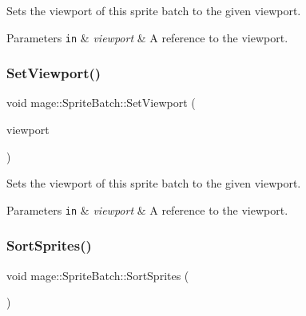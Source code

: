 Sets the viewport of this sprite batch to the given viewport.


\begin{DoxyParams}[1]{Parameters}
\mbox{\tt in}  & {\em viewport} & A reference to the viewport. \\
\hline
\end{DoxyParams}
\hypertarget{classmage_1_1_sprite_batch_aef86940ffc869785fb8ff8eb85ab7b46}{}\label{classmage_1_1_sprite_batch_aef86940ffc869785fb8ff8eb85ab7b46} 
\subsubsection{\texorpdfstring{Set\+Viewport()}{SetViewport()}\hspace{0.1cm}{\footnotesize\ttfamily [2/2]}}
{\footnotesize\ttfamily void mage\+::\+Sprite\+Batch\+::\+Set\+Viewport (\begin{DoxyParamCaption}\item[{D3\+D11\+\_\+\+V\+I\+E\+W\+P\+O\+RT \&\&}]{viewport }\end{DoxyParamCaption})\hspace{0.3cm}{\ttfamily [noexcept]}}

Sets the viewport of this sprite batch to the given viewport.


\begin{DoxyParams}[1]{Parameters}
\mbox{\tt in}  & {\em viewport} & A reference to the viewport. \\
\hline
\end{DoxyParams}
\hypertarget{classmage_1_1_sprite_batch_af7a5d406b02cd477c9b80eae9984aa86}{}\label{classmage_1_1_sprite_batch_af7a5d406b02cd477c9b80eae9984aa86} 
\subsubsection{\texorpdfstring{Sort\+Sprites()}{SortSprites()}}
{\footnotesize\ttfamily void mage\+::\+Sprite\+Batch\+::\+Sort\+Sprites (\begin{DoxyParamCaption}{ }\end{DoxyParamCaption})\hspace{0.3cm}{\ttfamily [private]}}

